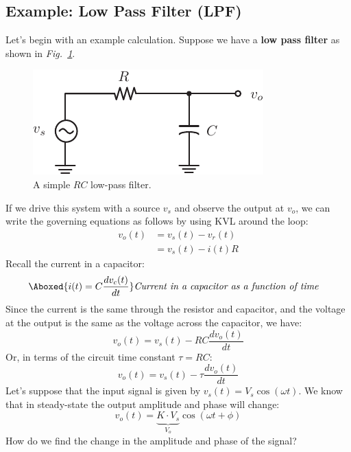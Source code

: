 \subsection{Example: Low Pass Filter (LPF)}
Let's begin with an example calculation.  Suppose we have a \textbf{low pass filter} as shown in \emph{Fig.~\ref{fig:lpf}}.
\begin{figure}[tb]
\centering
\includegraphics[scale=1]{lpf}
\caption{A simple $RC$ low-pass filter.}
\label{fig:lpf}
\end{figure}
If we drive this system with a source $v_s$ and observe the output at $v_o$, we can write the governing equations as follows by using KVL around the loop:
    \begin{align*}
        v_o(t) &= v_s(t) - v_r(t)\\
        &= v_s(t) - i(t) R
    \end{align*}
Recall the current in a capacitor:
    \begin{align}
        \Aboxed{ i(t) = C \frac{dv_c(t)}{dt} } &\textit{Current in a capacitor as a function of time}
        \label{eq:cap_curr}
    \end{align}
Since the current is the same through the resistor and capacitor, and the voltage at the output is the same as the voltage across the capacitor, we have:
    \begin{equation*}
        v_o(t) = v_s(t) - RC \frac{dv_o(t)}{dt}
    \end{equation*}
Or, in terms of the circuit time constant $\tau = RC$:
    \begin{equation}
        v_o(t) = v_s(t) - \tau \frac{dv_o(t)}{dt} \label{eq:lpf_diff}
    \end{equation}
Let's suppose that the input signal is given by $v_s(t) = V_s \cos(\omega t)$.  We know that in steady-state  the output amplitude and phase will change: 
    \begin{equation}
        v_o(t) = \underbrace{K \cdot V_s}_{V_o} \cos(\omega t + \phi) \label{eq:kvl1}
    \end{equation}  
How do we find the change in the amplitude and phase of the signal?
